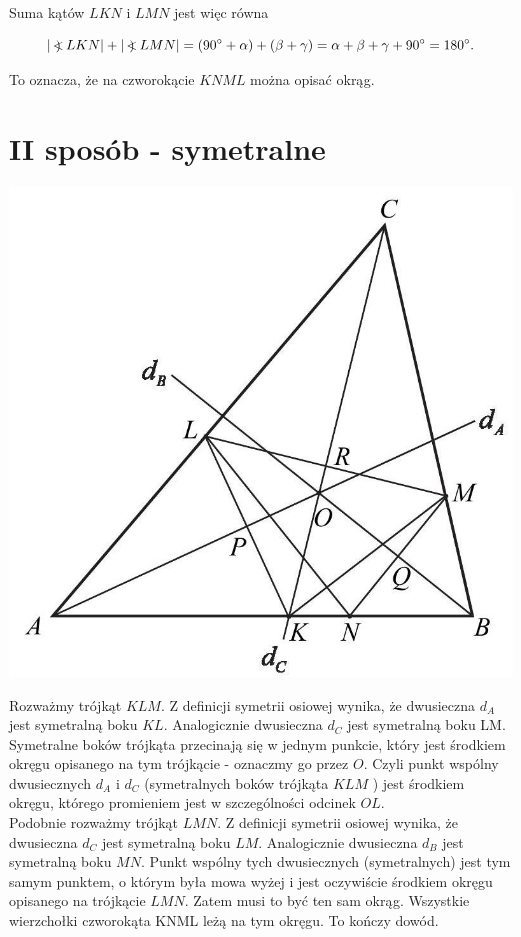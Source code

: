 \documentclass[10pt]{article}
\newcommand\Varangle{\mathop{{<\!\!\!\!\!\text{\small)}}\:}\nolimits}
\begin{document}
Suma kątów $L K N$ i $L M N$ jest więc równa

$$
|\Varangle L K N|+|\Varangle L M N|=\left(90^{\circ}+\alpha\right)+(\beta+\gamma)=\alpha+\beta+\gamma+90^{\circ}=180^{\circ} .
$$

To oznacza, że na czworokącie $K N M L$ można opisać okrąg.

\section*{II sposób - symetralne}
\begin{center}
\includegraphics[max width=\textwidth]{2025_02_07_a13180f11f288af0ed0dg-06}
\end{center}

Rozważmy trójkąt $K L M$. Z definicji symetrii osiowej wynika, że dwusieczna $d_{A}$ jest symetralną boku $K L$. Analogicznie dwusieczna $d_{C}$ jest symetralną boku LM. Symetralne boków trójkąta przecinają się w jednym punkcie, który jest środkiem okręgu opisanego na tym trójkącie - oznaczmy go przez $O$. Czyli punkt wspólny dwusiecznych $d_{A}$ i $d_{C}$ (symetralnych boków trójkąta $K L M$ ) jest środkiem okręgu, którego promieniem jest w szczególności odcinek $O L$.\\
Podobnie rozważmy trójkąt $L M N$. Z definicji symetrii osiowej wynika, że dwusieczna $d_{C}$ jest symetralną boku $L M$. Analogicznie dwusieczna $d_{B}$ jest symetralną boku $M N$. Punkt wspólny tych dwusiecznych (symetralnych) jest tym samym punktem, o którym była mowa wyżej i jest oczywiście środkiem okręgu opisanego na trójkącie $L M N$. Zatem musi to być ten sam okrąg. Wszystkie wierzchołki czworokąta KNML leżą na tym okręgu. To kończy dowód.
\end{document}
